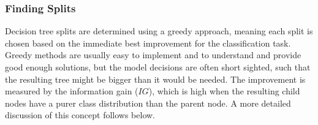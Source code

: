 \documentclass[letterpaper,10pt,english]{jupyterBook}
\begin{document}
\subsubsection{Finding Splits}
\label{\detokenize{classification_decision_trees:finding-splits}}
\sphinxAtStartPar
Decision tree splits are determined using a greedy approach, meaning each split is chosen based on the immediate best improvement for the classification task. Greedy methods are usually easy to implement and to understand and provide good enough solutions, but the model decisions are often short sighted, such that the resulting tree might be bigger than it would be needed. The improvement is measured by the information gain (\(IG\)), which is high when the resulting child nodes have a purer class distribution than the parent node. A more detailed discussion of this concept follows below.
\label{classification_decision_trees:dt_split}
\end{document}
